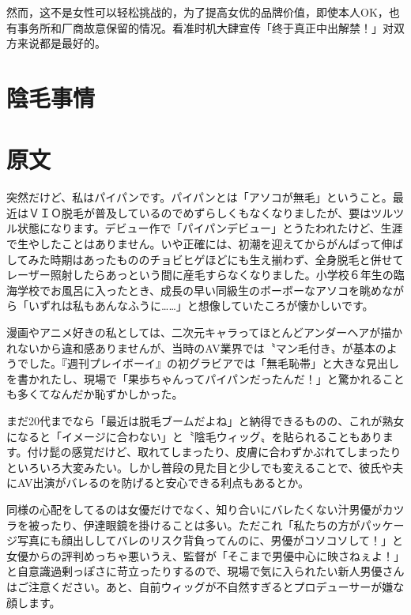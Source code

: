\documentclass[12pt,UTF8]{ctexbook}
\begin{document}
然而，这不是女性可以轻松挑战的，为了提高女优的品牌价值，即使本人OK，也有事务所和厂商故意保留的情况。看准时机大肆宣传「终于真正中出解禁！」对双方来说都是最好的。

\switchcolumn

\section{陰毛事情}

\switchcolumn

\section*{原文}

突然だけど、私はパイパンです。パイパンとは「アソコが無毛」ということ。最近はＶＩＯ脱毛が普及しているのでめずらしくもなくなりましたが、要はツルツル状態になります。デビュー作で「パイパンデビュー」とうたわれたけど、生涯で生やしたことはありません。いや正確には、初潮を迎えてからがんばって伸ばしてみた時期はあったもののチョビヒゲほどにも生え揃わず、全身脱毛と併せてレーザー照射したらあっという間に産毛すらなくなりました。小学校６年生の臨海学校でお風呂に入ったとき、成長の早い同級生のボーボーなアソコを眺めながら「いずれは私もあんなふうに……」と想像していたころが懐かしいです。

漫画やアニメ好きの私としては、二次元キャラってほとんどアンダーヘアが描かれないから違和感ありませんが、当時のAV業界では〝マン毛付き〟が基本のようでした。『週刊プレイボーイ』の初グラビアでは「無毛恥帯」と大きな見出しを書かれたし、現場で「果歩ちゃんってパイパンだったんだ！」と驚かれることも多くてなんだか恥ずかしかった。

まだ20代までなら「最近は脱毛ブームだよね」と納得できるものの、これが熟女になると「イメージに合わない」と〝陰毛ウィッグ〟を貼られることもあります。付け髭の感覚だけど、取れてしまったり、皮膚に合わずかぶれてしまったりといろいろ大変みたい。しかし普段の見た目と少しでも変えることで、彼氏や夫にAV出演がバレるのを防げると安心できる利点もあるとか。

同様の心配をしてるのは女優だけでなく、知り合いにバレたくない汁男優がカツラを被ったり、伊達眼鏡を掛けることは多い。ただこれ「私たちの方がパッケージ写真にも顔出ししてバレのリスク背負ってんのに、男優がコソコソして！」と女優からの評判めっちゃ悪いうえ、監督が「そこまで男優中心に映さねぇよ！」と自意識過剰っぽさに苛立ったりするので、現場で気に入られたい新人男優さんはご注意ください。あと、自前ウィッグが不自然すぎるとプロデューサーが嫌な顔します。

\switchcolumn
\end{document}
